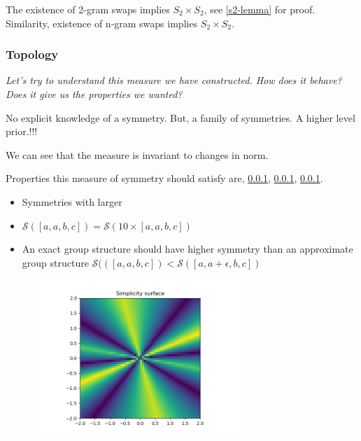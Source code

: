 The existence of 2-gram swaps implies $S_2 \times S_2$, see \ref{s2-lemma} for proof.
Similarity, existence of n-gram swaps implies $S_2 \times S_2$.

\subsubsection{Topology}

\begin{displayquote}
\textsl{Let's try to understand this measure we have constructed. How does it behave?
Does it give us the properties we wanted?}
\end{displayquote}

No explicit knowledge of a symmetry. But, a family of symmetries. A higher level prior.!!!

We can see that the measure is invariant to changes in norm.

Properties this measure of symmetry should satisfy are, \ref{}, \ref{}, \ref{}.

\begin{itemize}
	\tightlist
	\item Symmetries with larger
	\item $\mathcal S([a,a,b,c]) = \mathcal S(10 \times [a,a,b,c])$
	\item An exact group structure should have higher symmetry than an approximate group structure $\mathcal S(([a,a,b,c]) < \mathcal S([a,a+\epsilon,b,c])$
\end{itemize}

\begin{figure}[h!]
\centering
\includegraphics[width=0.7\textwidth,height=0.35\textheight]{../../pictures/figures/complexity_surface_nd-3d.png}
\caption{}
\end{figure}

